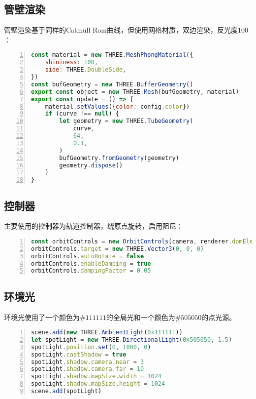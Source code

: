 \subsection{管壁渲染}

管壁渲染基于同样的Catmull Rom曲线，但使用网格材质，双边渲染，反光度$100$：

\begin{lstlisting}[language=JavaScript,
   backgroundcolor=\color{lightgray},
   extendedchars=true,
   basicstyle=\footnotesize\ttfamily,
   showstringspaces=false,
   showspaces=false,
   numbers=left,
   numberstyle=\footnotesize,
   numbersep=9pt,
   tabsize=2,
   breaklines=true,
   showtabs=false,
   captionpos=b]
const material = new THREE.MeshPhongMaterial({
    shininess: 100,
    side: THREE.DoubleSide,
})
const bufGeometry = new THREE.BufferGeometry()
export const object = new THREE.Mesh(bufGeometry, material)
export const update = () => {
    material.setValues({color: config.color})
    if (curve !== null) {
        let geometry = new THREE.TubeGeometry(
            curve,
            64,
            0.1,
        )
        bufGeometry.fromGeometry(geometry)
        geometry.dispose()
    }
}
\end{lstlisting}

\subsection{控制器}

主要使用的控制器为轨道控制器，绕原点旋转，启用阻尼：

\begin{lstlisting}[language=JavaScript,
   backgroundcolor=\color{lightgray},
   extendedchars=true,
   basicstyle=\footnotesize\ttfamily,
   showstringspaces=false,
   showspaces=false,
   numbers=left,
   numberstyle=\footnotesize,
   numbersep=9pt,
   tabsize=2,
   breaklines=true,
   showtabs=false,
   captionpos=b]
const orbitControls = new OrbitControls(camera, renderer.domElement)
orbitControls.target = new THREE.Vector3(0, 0, 0)
orbitControls.autoRotate = false
orbitControls.enableDamping = true
orbitControls.dampingFactor = 0.05
\end{lstlisting}

\subsection{环境光}

环境光使用了一个颜色为$\#111111$的全局光和一个颜色为$\#505050$的点光源。

\begin{lstlisting}[language=JavaScript,
   backgroundcolor=\color{lightgray},
   extendedchars=true,
   basicstyle=\footnotesize\ttfamily,
   showstringspaces=false,
   showspaces=false,
   numbers=left,
   numberstyle=\footnotesize,
   numbersep=9pt,
   tabsize=2,
   breaklines=true,
   showtabs=false,
   captionpos=b]
scene.add(new THREE.AmbientLight(0x111111))
let spotLight = new THREE.DirectionalLight(0x505050, 1.5)
spotLight.position.set(0, 1000, 0)
spotLight.castShadow = true
spotLight.shadow.camera.near = 3
spotLight.shadow.camera.far = 10
spotLight.shadow.mapSize.width = 1024
spotLight.shadow.mapSize.height = 1024
scene.add(spotLight)
\end{lstlisting}
